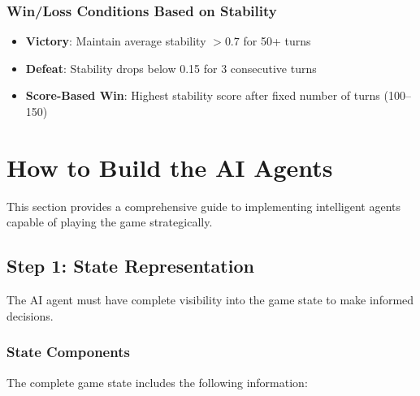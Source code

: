 \documentclass[12pt,a4paper]{article}
\begin{document}
\subsubsection{Win/Loss Conditions Based on Stability}

\begin{itemize}
    \item \textbf{Victory}: Maintain average stability $> 0.7$ for 50+ turns
    \item \textbf{Defeat}: Stability drops below 0.15 for 3 consecutive turns
    \item \textbf{Score-Based Win}: Highest stability score after fixed number of turns (100--150)
\end{itemize}

\section{How to Build the AI Agents}

This section provides a comprehensive guide to implementing intelligent agents capable of playing the game strategically.

\subsection{Step 1: State Representation}

The AI agent must have complete visibility into the game state to make informed decisions.

\subsubsection{State Components}

The complete game state includes the following information:
\end{document}
